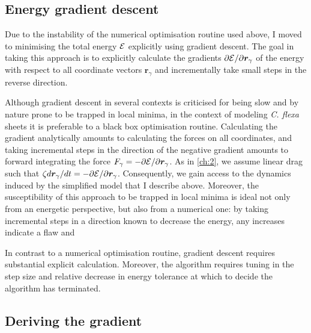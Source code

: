 \subsection{Energy gradient descent}

Due to the instability of the numerical optimisation routine used above, I moved to minimising the total energy $\mathcal{E}$ explicitly using gradient descent. 
The goal in taking this approach is to explicitly calculate the gradients $\partial \mathcal{E} / \partial \bm{r}_\gamma$ of the energy with respect to all coordinate vectors $\bm{r}_\gamma$ and incrementally take small steps in the reverse direction. 

Although gradient descent in several contexts is criticised for being slow and by nature prone to be trapped in local minima, in the context of modeling \textit{C. flexa} sheets it is preferable to a black box optimisation routine. Calculating the gradient analytically amounts to calculating the forces on all coordinates, and taking incremental steps in the direction of the negative gradient amounts to forward integrating the force $F_\gamma = - \partial\mathcal{E}/\partial\bm{r}_\gamma$. 
As in \cref{ch:2}, we assume linear drag such that $\zeta d\bm{r}_\gamma/dt = -\partial\mathcal{E}/\partial\bm{r}_\gamma$. 
Consequently, we gain access to the dynamics induced by the simplified model that I describe above. 
Moreover, the susceptibility of this approach to be trapped in local minima is ideal not only from an energetic perspective, but also from a numerical one: by taking incremental steps in a direction known to decrease the energy, any increases indicate a flaw and 

In contrast to a numerical optimisation routine, gradient descent requires substantial explicit calculation. Moreover, the algorithm requires tuning in the step size and relative decrease in energy tolerance at which to decide the algorithm has terminated. 

\subsection{Deriving the gradient}

